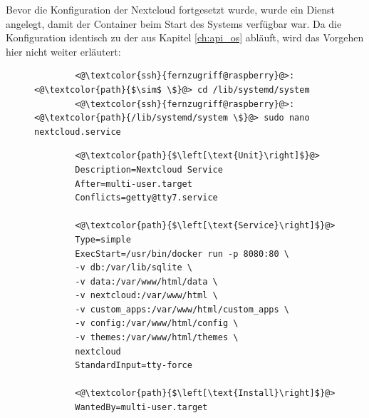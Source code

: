 \documentclass[a4paper, 12pt]{scrartcl}
\begin{document}
Bevor die Konfiguration der Nextcloud fortgesetzt wurde, wurde ein Dienst angelegt, damit der Container beim Start des Systems verfügbar war. Da die Konfiguration
identisch zu der aus Kapitel \ref{ch:api_os} abläuft, wird das Vorgehen hier nicht weiter erläutert:
\begin{figure}[H]
    \begin{mdframed}[backgroundcolor=bbg]
        \begin{lstlisting}
        <@\textcolor{ssh}{fernzugriff@raspberry}@>:<@\textcolor{path}{$\sim$ \$}@> cd /lib/systemd/system
        <@\textcolor{ssh}{fernzugriff@raspberry}@>:<@\textcolor{path}{/lib/systemd/system \$}@> sudo nano nextcloud.service
        \end{lstlisting}
    \end{mdframed}
    \label{lst:create_service_file_nextcloud}
\end{figure}

\begin{figure}[H]
    \begin{mdframed}[backgroundcolor=bbg]
        \begin{lstlisting}
        <@\textcolor{path}{$\left[\text{Unit}\right]$}@>
        Description=Nextcloud Service
        After=multi-user.target
        Conflicts=getty@tty7.service

        <@\textcolor{path}{$\left[\text{Service}\right]$}@>
        Type=simple
        ExecStart=/usr/bin/docker run -p 8080:80 \
        -v db:/var/lib/sqlite \
        -v data:/var/www/html/data \
        -v nextcloud:/var/www/html \
        -v custom_apps:/var/www/html/custom_apps \
        -v config:/var/www/html/config \
        -v themes:/var/www/html/themes \
        nextcloud
        StandardInput=tty-force

        <@\textcolor{path}{$\left[\text{Install}\right]$}@>
        WantedBy=multi-user.target
        \end{lstlisting}
    \end{mdframed}
    \label{lst:service_file}
\end{figure}
\end{document}
